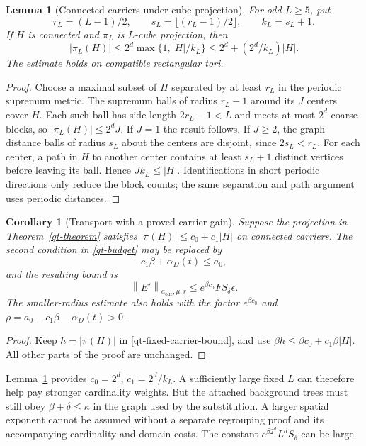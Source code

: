 \documentclass[11pt]{article}
\newtheorem{lemma}[theorem]{Lemma}
\newtheorem{corollary}[theorem]{Corollary}
\theoremstyle{remark}
\newcommand{\norm}[1]{\left\|#1\right\|}
\begin{document}
\begin{lemma}[Connected carriers under cube projection]\label{qt-compression}
For odd $L\ge5$, put
\begin{equation}\label{qt-compression-constants}
 r_L=(L-1)/2,\qquad s_L=\lfloor(r_L-1)/2\rfloor,
 \qquad k_L=s_L+1.
\end{equation}
If $H$ is connected and $\pi_L$ is $L$-cube projection, then
\begin{equation}\label{qt-compression-bound}
 |\pi_L(H)|\le2^d\max\{1,|H|/k_L\}
           \le2^d+(2^d/k_L)|H|.
\end{equation}
The estimate holds on compatible rectangular tori.
\end{lemma}
\begin{proof}
Choose a maximal subset of $H$ separated by at least $r_L$ in
the periodic supremum metric. The supremum balls of radius
$r_L-1$ around its $J$ centers cover $H$. Each such ball has
side length $2r_L-1<L$ and meets at most $2^d$ coarse blocks,
so $|\pi_L(H)|\le2^d J$. If $J=1$ the result follows.
If $J\ge2$, the graph-distance balls of radius $s_L$ about
the centers are disjoint, since $2s_L<r_L$. For each center,
a path in $H$ to another center contains at least $s_L+1$
distinct vertices before leaving its ball. Hence
$Jk_L\le|H|$. Identifications in short periodic directions
only reduce the block counts; the same separation and path
argument uses periodic distances.
\end{proof}

\begin{corollary}[Transport with a proved carrier gain]\label{qt-compressed-transport}
Suppose the projection in Theorem~\ref{qt-theorem} satisfies
$|\pi(H)|\le c_0+c_1|H|$ on connected carriers. The second
condition in \eqref{qt-budget} may be replaced by
\begin{equation}\label{qt-compressed-budget}
 c_1\beta+\alpha_D(t)\le a_0,
\end{equation}
and the resulting bound is
\begin{equation}\label{qt-compressed-bound}
 \norm{E'}_{a_{\mathrm{out}},\mu;r}
       \le e^{\beta c_0}F S_\delta\epsilon.
\end{equation}
The smaller-radius estimate also holds with the factor
$e^{\beta c_0}$ and
$\rho=a_0-c_1\beta-\alpha_D(t)>0$.
\end{corollary}
\begin{proof}
Keep $h=|\pi(H)|$ in \eqref{qt-fixed-carrier-bound}, and
use $\beta h\le\beta c_0+c_1\beta |H|$. All other parts
of the proof are unchanged.
\end{proof}
Lemma~\ref{qt-compression} provides
$c_0=2^d$, $c_1=2^d/k_L$. A sufficiently large fixed $L$
can therefore help pay stronger cardinality weights. But the
attached background trees must still obey
$\beta+\delta\le\kappa$ in the graph used by the substitution.
A larger spatial exponent cannot be assumed without a separate
regrouping proof and its accompanying cardinality and domain costs.
The constant $e^{\beta2^d}L^d S_\delta$ can be large.
\end{document}
